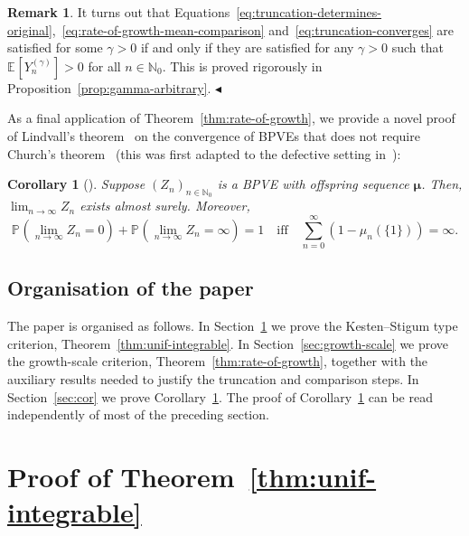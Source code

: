 \documentclass[12pt]{article}
\newtheorem{cor}[thm]{Corollary}
\theoremstyle{definition}
\newtheorem{rmq}[thm]{Remark}
\newcommand{\E}[2][]{\ensuremath{\mathbb{E}_{#1}\left[#2 \right]}}
\newcommand{\Prob}[2][]{\ensuremath{\mathbb{P}_{#1} \left(#2 \right)}}
\newcommand{\ensymboldremark }{\hfill$\blacktriangleleft$}
\begin{document}
\begin{rmq} \label{rmq:gamma-arbitrary}
    It turns out that Equations~\eqref{eq:truncation-determines-original},~\eqref{eq:rate-of-growth-mean-comparison} and~\eqref{eq:truncation-converges} are satisfied for some $\gamma > 0$ if and only if they are satisfied for any $\gamma >0$ such that $\E{Y^{(\gamma)}_{n}} > 0$ for all $n \in \mathbb{N}_0$. This is proved rigorously in Proposition~\ref{prop:gamma-arbitrary}.  {\small\ensymboldremark }
\end{rmq}

As a final application of Theorem~\ref{thm:rate-of-growth}, we provide a novel proof of Lindvall's theorem~\cite{lindval} on the convergence of BPVEs that does not require Church's theorem~\cite{church} (this was first adapted to the defective setting in~\cite{defective-bpves}):

\begin{cor}[{\cite[Theorem 1]{lindval}}] \label{cor:lindval}
Suppose $(Z_{n})_{n\in \mathbb{N}_0}$ is a BPVE with offspring sequence $\boldsymbol{\mu}$. Then, $\lim_{n \to \infty} Z_{n}$ exists almost surely. Moreover, 
\begin{equation} \label{eq:lindval}
    \Prob{\lim_{n\to \infty} Z_{n} = 0} + \Prob{\lim_{n\to \infty} Z_{n} = \infty} = 1 \quad \text{iff} \quad \sum_{n=0}^{\infty} \left(1 - \mu_{n}\left(\{1\}\right) \right) = \infty.   
\end{equation}
\end{cor}

\subsection{Organisation of the paper}

The paper is organised as follows. In Section~\ref{sec:unif-int} we prove the Kesten--Stigum type criterion, Theorem~\ref{thm:unif-integrable}. In Section~\ref{sec:growth-scale} we prove the growth-scale criterion, Theorem~\ref{thm:rate-of-growth}, together with the auxiliary results needed to justify the truncation and comparison steps. In Section~\ref{sec:cor} we prove Corollary~\ref{cor:lindval}. The proof of Corollary~\ref{cor:lindval} can be read independently of most of the preceding section.


\section{Proof of Theorem~\ref{thm:unif-integrable}} \label{sec:unif-int}
\end{document}
